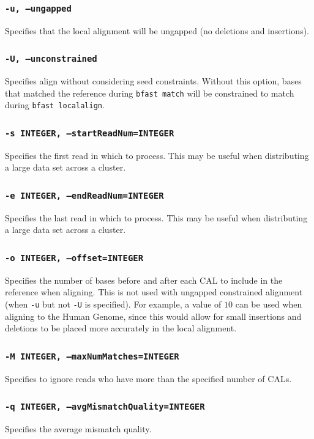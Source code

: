 \documentclass[a4paper,12pt]{book}
\newcommand{\TT}[1]{{\tt #1}} %
\begin{document}
\subsubsection{\TT{-u, --ungapped}}
Specifies that the local alignment will be ungapped (no deletions and insertions).

\subsubsection{\TT{-U, --unconstrained}}
Specifies align without considering seed constraints.  
Without this option, bases that matched the reference during \TT{bfast match} will be constrained to match during \TT{bfast localalign}.

\subsubsection{\TT{-s INTEGER, --startReadNum=INTEGER}}
Specifies the first read in which to process.
This may be useful when distributing a large data set across a cluster.

\subsubsection{\TT{-e INTEGER, --endReadNum=INTEGER}}
Specifies the last read in which to process.
This may be useful when distributing a large data set across a cluster.

\subsubsection{\TT{-o INTEGER, --offset=INTEGER}}
Specifies the number of bases before and after each CAL to include in the reference when aligning.  
This is not used with ungapped constrained alignment (when \TT{-u} but not \TT{-U} is specified).
For example, a value of $10$ can be used when aligning to the Human Genome, since this would allow for small insertions and deletions to be placed more accurately in the local alignment.

\subsubsection{\TT{-M INTEGER, --maxNumMatches=INTEGER}}
Specifies to ignore reads who have more than the specified number of CALs.


\subsubsection{\TT{-q INTEGER, --avgMismatchQuality=INTEGER}}
Specifies the average mismatch quality.
\end{document}
